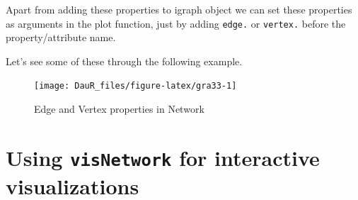 \documentclass[
]{book}
\newenvironment{Shaded}{\begin{snugshade}}{\end{snugshade}}
\newcommand{\AttributeTok}[1]{\textcolor[rgb]{0.13,0.29,0.53}{#1}}
\newcommand{\CommentTok}[1]{\textcolor[rgb]{0.56,0.35,0.01}{\textit{#1}}}
\newcommand{\DecValTok}[1]{\textcolor[rgb]{0.00,0.00,0.81}{#1}}
\newcommand{\FloatTok}[1]{\textcolor[rgb]{0.00,0.00,0.81}{#1}}
\newcommand{\FunctionTok}[1]{\textcolor[rgb]{0.13,0.29,0.53}{\textbf{#1}}}
\newcommand{\NormalTok}[1]{#1}
\newcommand{\OtherTok}[1]{\textcolor[rgb]{0.56,0.35,0.01}{#1}}
\newcommand{\SpecialCharTok}[1]{\textcolor[rgb]{0.81,0.36,0.00}{\textbf{#1}}}
\newcommand{\StringTok}[1]{\textcolor[rgb]{0.31,0.60,0.02}{#1}}
\begin{document}
Apart from adding these properties to igraph object we can set these properties as arguments in the plot function, just by adding \texttt{edge.} or \texttt{vertex.} before the property/attribute name.

Let's see some of these through the following example.

\begin{Shaded}
\end{Shaded}

\begin{figure}

{\centering \texttt{[image: DauR\_files/figure-latex/gra33-1]} 

}

\caption{Edge and Vertex properties in Network}\label{fig:gra33}
\end{figure}

\hypertarget{using-visnetwork-for-interactive-visualizations}{%
\section{\texorpdfstring{Using \texttt{visNetwork} for interactive visualizations}{Using visNetwork for interactive visualizations}}\label{using-visnetwork-for-interactive-visualizations}}
\end{document}
